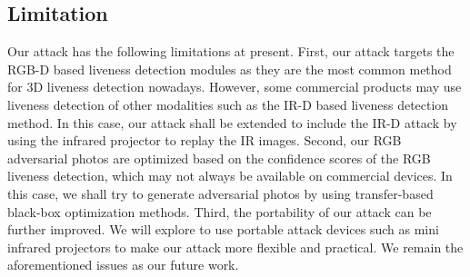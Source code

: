 

\subsection{Limitation}
Our attack has the following limitations at present. 
First, our attack targets the RGB-D based liveness detection modules as they are the most common method for 3D liveness detection nowadays. However, some commercial products may use liveness detection of other modalities such as the IR-D based liveness detection method. In this case, our attack shall be extended to include the IR-D attack by using the infrared projector to replay the IR images.
Second, our RGB adversarial photos are optimized based on the confidence scores of the RGB liveness detection, which may not always be available on commercial devices. In this case, we shall try to generate adversarial photos by using transfer-based black-box optimization methods.
Third, the portability of our attack can be further improved. We will explore to use portable attack devices such as mini infrared projectors to make our attack more flexible and practical. We remain the aforementioned issues as our future work.
